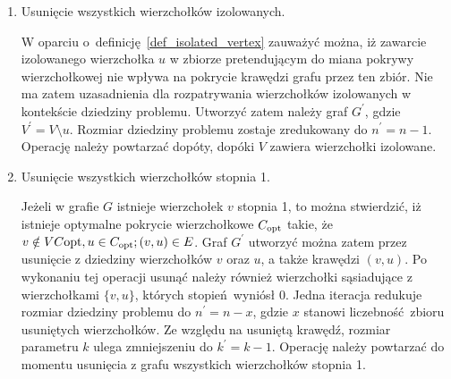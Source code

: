 \begin{enumerate}
  \item Usunięcie wszystkich wierzchołków izolowanych.


    W oparciu o~definicję~\ref{def_isolated_vertex} zauważyć można, iż zawarcie
    izolowanego wierzchołka $u$ w zbiorze pretendującym do miana pokrywy
    wierzchołkowej nie wpływa na pokrycie krawędzi grafu przez ten zbiór.
    Nie ma zatem uzasadnienia dla rozpatrywania wierzchołków izolowanych w
    kontekście dziedziny problemu.
    Utworzyć zatem należy graf $G^\prime$, gdzie $V^\prime = V
    \setminus u$.
    Rozmiar dziedziny problemu zostaje zredukowany do $n^\prime=n-1$.
    Operację należy powtarzać dopóty, dopóki $V$ zawiera wierzchołki izolowane.

  \item Usunięcie wszystkich wierzchołków stopnia 1.


    Jeżeli w grafie $G$ istnieje wierzchołek $v$ stopnia 1, to można 
    stwierdzić, iż istnieje optymalne pokrycie wierzchołkowe $C_{\textnormal{opt}}$ takie, że
    $v \notin VC{\textnormal{opt}}, u \in C_{\textnormal{opt}}; (v,u) \in E$.
    Graf $G^\prime$ utworzyć można zatem przez usunięcie z dziedziny wierzchołków $v$ oraz
    $u$, a także krawędzi $(v,u)$.
    Po wykonaniu tej operacji usunąć należy również wierzchołki sąsiadujące z wierzchołkami
    $\{v,u\}$, których stopień~wyniósł 0.
    Jedna iteracja redukuje rozmiar dziedziny problemu do $n^\prime=n-x$, gdzie
    $x$ stanowi liczebność~zbioru usuniętych wierzchołków.
    Ze względu na usuniętą krawędź, rozmiar parametru $k$ ulega zmniejszeniu do
    $k^\prime=k-1$.
    Operację należy powtarzać do momentu usunięcia z grafu wszystkich
    wierzchołków stopnia 1.


\end{enumerate}
